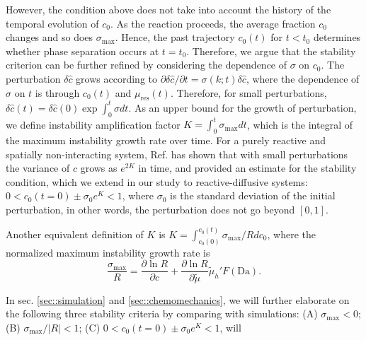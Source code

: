 \documentclass[reprint,aps,pre,superscriptaddress]{revtex4-2}
\newcommand{\pderiv}[2]{\frac{\partial {#1}}{\partial {#2}}}
\begin{document}
However, the condition above does not take into account the history of the temporal evolution of $c_0$. As the reaction proceeds, the average fraction $c_0$ changes and so does $\sigma_\text{max}$. Hence, the past trajectory $c_0(t)$ for $t<t_0$ determines whether phase separation occurs at $t=t_0$.
Therefore, we argue that the stability criterion can be further refined by considering the dependence of $\sigma$ on $c_0$.
The perturbation $\delta \hat{c}$ grows according to $\partial \delta \hat{c} /\partial t = \sigma(k;t) \delta \hat{c}$, where the dependence of $\sigma$ on $t$ is through $c_0(t)$ and $\mu_\text{res}(t)$.
Therefore, for small perturbations, $\delta \hat{c}(t) = \delta \hat{c}(0)\exp{\int_0^t{\sigma dt}}$.
As an upper bound for the growth of perturbation, we define instability amplification factor $K=\int_0^t{\sigma_\text{max} dt}$, which is the integral of the maximum instability growth rate over time. For a purely reactive and spatially non-interacting system, Ref. \cite{Zhao2020} has shown that with small perturbations the variance of $c$ grows as $e^{2K}$ in time, and provided an estimate for the stability condition, which we extend in our study to reactive-diffusive systems: $0 < c_0(t=0) \pm \sigma_0 e^K < 1$, where $\sigma_0$ is the standard deviation of the initial perturbation, in other words, the perturbation does not go beyond $[0,1]$.

Another equivalent definition of $K$ is $K = \int_{c_0(0)}^{c_0(t)}{\sigma_\text{max}/R dc_0}$,
where the normalized maximum instability growth rate is
\begin{equation} \label{eqn::normalized_sigma_general}
  \frac{\sigma_\text{max}}{R} =  \pderiv{\ln{R}}{c} + \pderiv{\ln{R}}{\tilde{\mu}} \tilde{\mu}_h' F(\text{Da}).
\end{equation}

In sec. \ref{sec::simulation} and \ref{sec::chemomechanics}, we will further elaborate on the following three stability criteria by comparing with simulations: (A) $\sigma_\text{max}<0$; (B) $\sigma_\text{max}/|R|<1$; (C) $0 < c_0(t=0) \pm \sigma_0 e^K < 1$, will 

\end{document}
